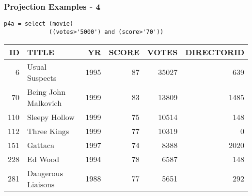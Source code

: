 \documentclass[dvipsnames]{beamer}
\theoremstyle{plain}
\begin{document}
\begin{frame}[fragile]
  \frametitle{Projection Examples - 4}

    \begin{example}
      \begin{lstlisting}
p4a = select (movie)
             ((votes>'5000') and (score>'70'))
      \end{lstlisting}

      \pause
      \begin{tiny}
      \begin{table}
        \begin{tabular}{|r|l|r|r|r|r|}\hline
 ID & TITLE                &   YR & SCORE & VOTES & DIRECTORID\\\hline\hline
  6 & Usual Suspects       & 1995 &    87 & 35027 &        639\\\hline
 70 & Being John Malkovich & 1999 &    83 & 13809 &       1485\\\hline
110 & Sleepy Hollow        & 1999 &    75 & 10514 &        148\\\hline
112 & Three Kings          & 1999 &    77 & 10319 &          0\\\hline
151 & Gattaca              & 1997 &    74 &  8388 &       2020\\\hline
228 & Ed Wood              & 1994 &    78 &  6587 &        148\\\hline
281 & Dangerous Liaisons   & 1988 &    77 &  5651 &        292\\\hline
      \end{tabular}
    \end{table}
    \end{tiny}
  \end{example}
\end{frame}
\end{document}
